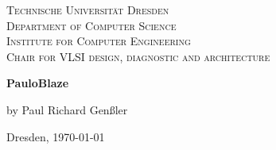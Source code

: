 \documentclass[11pt, a4paper, twoside, cleardoubleempty, openright, pointlessnumbers]{scrreprt} %
\newcommand{\getTitle}{PauloBlaze}
\begin{document}
{\begin{center}
	\textsc{\Large Technische Universität Dresden\\
		Department of Computer Science\\
		Institute for Computer Engineering\\
		Chair for VLSI design, diagnostic and architecture\\ \vspace{2\baselineskip} }
		
	\vspace{8\baselineskip}
		
	\textbf{\LARGE \getTitle{} \vspace{\baselineskip}}
	

	\vspace{2\baselineskip}
		
	\large by Paul Richard Genßler\\
	\vspace{22\baselineskip}

	\end{center}

	Dresden, \today
	
	\newpage
}	
	
	\newpage
	\mbox{}
	\thispagestyle{empty}
	\newpage
	
	
\setcounter{page}{3}


%

%

	\newpage
	\markboth{}{}
	\setcounter{tocdepth}{3} %
	\setcounter{secnumdepth}{3} %
	 \tableofcontents

	\markboth{}{}
	\newpage
	
	
	\clearscrheadfoot
	\lehead[]{\leftmark}
	\rohead[]{\rightmark}
	\ofoot[\pagemark]{\pagemark}
	
	\cleardoublepage		%
	\setcounter{page}{5}%

	\graphicspath{ {../diagrams/} }	
	
	
	
	
	
	
	\newpage
	\mbox{}
	\thispagestyle{empty}
	\newpage
	
	
	
	\newpage
	\mbox{}
	\thispagestyle{empty}
	\newpage
	
	
	\printbibliography
		
\end{document}
